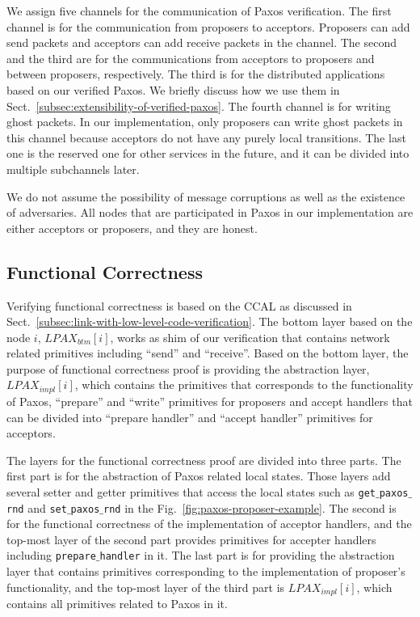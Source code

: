 We assign five channels for the communication of Paxos verification. 
The first channel is for the communication from proposers to acceptors. 
Proposers can add send packets and acceptors can add receive packets in the channel. 
The second  and the third  are 
for the communications from acceptors to proposers and between proposers, respectively.
The third is for the distributed applications based on our verified Paxos. 
We briefly discuss how we use them in Sect.~\ref{subsec:extensibility-of-verified-paxos}.
The fourth channel is for writing ghost packets.
In our implementation, only proposers can write ghost packets in this channel because acceptors do not have any purely local transitions.
The last one is the reserved one for other services in the future, and it can be divided into multiple subchannels later.

We do not assume the possibility of message corruptions as well as the existence of adversaries. 
All nodes that are participated in Paxos in our implementation are either acceptors or proposers, and they are honest.


\subsection{Functional Correctness}
\label{subsec:functional-correctness}

Verifying functional correctness is based on the  CCAL
as discussed in Sect.~\ref{subsec:link-with-low-level-code-verification}.
The bottom layer based on the node $i$, $LPAX_{btm}[i]$, works as shim of our verification that contains network related primitives 
including ``send'' and ``receive''.
Based on the bottom layer, 
the purpose of functional correctness proof is providing 
the abstraction layer,  $LPAX_{impl}[i]$, which contains the primitives that 
corresponds to the functionality of Paxos,
``prepare'' and ``write'' primitives for proposers and 
accept handlers that can be divided into ``prepare handler'' and ``accept handler'' primitives for acceptors.

The layers for the functional correctness proof are divided into three parts.
The first part is for the abstraction of Paxos related local states. 
Those layers add several setter and getter primitives that access 
the local states such as \texttt{get$\_$paxos$\_$rnd} and  \texttt{set$\_$paxos$\_$rnd} in the Fig.~\ref{fig:paxos-proposer-example}.
The second is for the functional correctness of the implementation of acceptor handlers, and the top-most layer of the second part provides primitives for accepter handlers including \texttt{prepare$\_$handler} in it. 
The last part is for providing the abstraction layer that contains primitives corresponding to the implementation of proposer's functionality, 
and the top-most layer of the third part is $LPAX_{impl}[i]$, which contains all primitives 
related to Paxos in it. 

